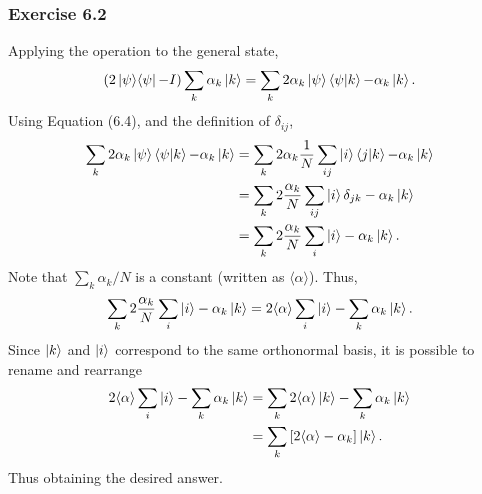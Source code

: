 \subsubsection{Exercise 6.2}
Applying the operation to the general state,
\begin{align}
    (2 \mathop{\mathinner{ |{\psi}\rangle \langle{\psi}|}} - I) \sum_k \alpha_k \ket{k} = 
    \sum_k 2 \alpha_k \ket{\psi} \mathop{\mathinner{ \langle{\psi}|{k}\rangle}} - \alpha_k \ket{k}.
\end{align}
Using Equation (6.4), and the definition of $\delta_{ij}$,
\begin{align}
    \sum_k 2 \alpha_k \ket{\psi} \mathop{\mathinner{ \langle{\psi}|{k}\rangle}} - \alpha_k \ket{k} &=
    \sum_k 2 \alpha_k \frac{1}{N} \sum_{ij} \ket{i} \mathop{\mathinner{ \langle{j}|{k}\rangle}} - \alpha_k \ket{k} \\
    & = \sum_k 2 \frac{\alpha_k}{N} \sum_{ij} \ket{i} \delta_{jk} - \alpha_k \ket{k} \\
    & = \sum_k 2 \frac{\alpha_k}{N} \sum_i \ket{i} - \alpha_k \ket{k}.
\end{align}
Note that $\sum_k \alpha_k/N$ is a constant
(written as $\langle\alpha\rangle$). Thus,
\begin{align}
    \sum_k 2 \frac{\alpha_k}{N} \sum_i \ket{i} - \alpha_k \ket{k} =
    2 \langle\alpha\rangle \sum_i \ket{i} - \sum_k \alpha_k \ket{k}.
\end{align}
Since $\ket{k}$ and $\ket{i}$ correspond to the same orthonormal basis,
it is possible to rename and rearrange
\begin{align}
    2 \langle\alpha\rangle \sum_i \ket{i} - \sum_k \alpha_k \ket{k} &=
    \sum_k 2 \langle\alpha\rangle \ket{k} - \sum_k \alpha_k \ket{k} \\
    &= \sum_k \left[ 2 \langle\alpha\rangle - \alpha_k \right] \ket{k}.
\end{align}
Thus obtaining the desired answer.

